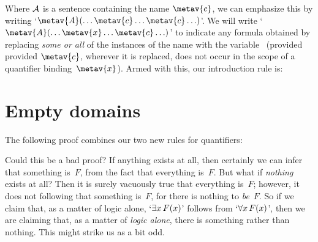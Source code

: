 Where $\mathcal{A}$ is a sentence containing the name $\metav{c}$, we
can emphasize this by writing `$\metav{A}(\ldots \metav{c} \ldots
\metav{c}\ldots)$'. We will write `$\metav{A}(\ldots \metav{x} \ldots
\metav{c}\ldots)$' to indicate any formula obtained by replacing
\emph{some or all} of the instances of the name  with the
variable~ (provided provided $\metav{c}$, wherever it is
replaced, does not occur in the scope of a quantifier
binding~$\metav{x}$). Armed with this, our introduction rule is:

\section{Empty domains}
The following proof combines our two new rules for quantifiers:
	\begin{fitchproof}
		\PR
	\end{fitchproof}
Could this be a bad proof? If anything exists at all, then certainly we can infer that something is~$F$, from the fact that everything is~$F$. But what if \emph{nothing} exists at all? Then it is surely vacuously true that everything is~$F$; however, it does not following that something is~$F$, for there is nothing to \emph{be}~$F$. So if we claim that, as a matter of logic alone, `$\exists x\,F(x)$' follows from `$\forall x\,F(x)$', then we are claiming that, as a matter of \emph{logic alone}, there is something rather than nothing. This might strike us as a bit odd.

